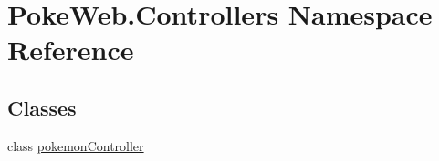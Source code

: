 \hypertarget{namespace_poke_web_1_1_controllers}{}\section{Poke\+Web.\+Controllers Namespace Reference}
\label{namespace_poke_web_1_1_controllers}
\subsection*{Classes}
\begin{DoxyCompactItemize}
\item 
class \mbox{\hyperlink{class_poke_web_1_1_controllers_1_1pokemon_controller}{pokemon\+Controller}}
\end{DoxyCompactItemize}
